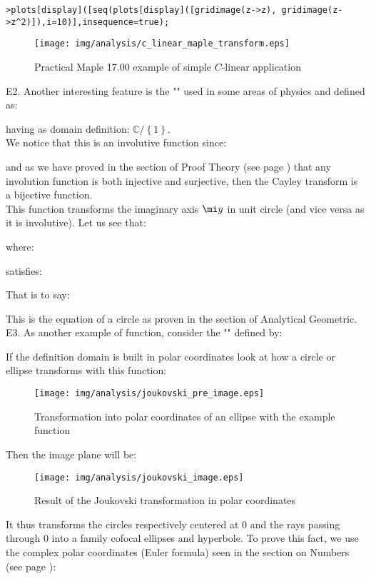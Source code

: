 \begin{tcolorbox}[colframe=black,colback=white,sharp corners,breakable]
\texttt{>plots[display]([seq(plots[display]([gridimage(z->z), gridimage(z->z\string^2)]),i=10)],insequence=true);}
	\begin{figure}[H]
		\begin{center}
			\texttt{[image: img/analysis/c\_linear\_maple\_transform.eps]}
		\end{center}	
		\caption{Practical Maple 17.00 example of simple $C$-linear application}
	\end{figure}
	E2. Another interesting feature is the "" used in some areas of physics and defined as:
	
	having as domain definition: $\mathbb{C}/\left\lbrace 1\right\rbrace$.\\

	We notice that this is an involutive function since:
	
	and as we have proved in the section of Proof Theory (see page \pageref{proof involution is a bijection}) that any involution function is both injective and surjective, then the Cayley transform is a bijective function.\\

	This function transforms the imaginary axis $\mi y$ in unit circle (and vice versa as it is involutive). Let us see that:
	
	where:
	
	satisfies:
	
	That is to say:
	
	This is the equation of a circle as proven in the section of Analytical Geometric.\\
	
	E3. As another example of function, consider the "" defined by:
	
If the definition domain is built in polar coordinates look at how a circle or ellipse transforms with this function:
	\begin{figure}[H]
		\begin{center}
			\texttt{[image: img/analysis/joukovski\_pre\_image.eps]}
		\end{center}	
		\caption[Transformation into polar coordinates of an ellipse]{Transformation into polar coordinates of an ellipse with the example function}
	\end{figure}
	Then the image plane will be:
	\begin{figure}[H]
		\begin{center}
			\texttt{[image: img/analysis/joukovski\_image.eps]}
		\end{center}	
		\caption{Result of the Joukovski transformation in polar coordinates}
	\end{figure}
	It thus transforms the circles respectively centered at $0$ and the rays passing through $0$ into a family cofocal ellipses and hyperbole. To prove this fact, we use the complex polar coordinates (Euler formula) seen in the section on Numbers (see page \pageref{euler formula}):
	

\end{tcolorbox}
